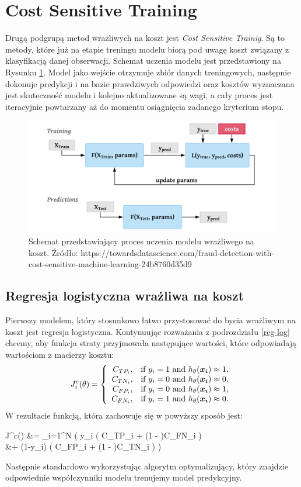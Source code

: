\documentclass{book}
\begin{document}
\section{Cost Sensitive Training}
	Drugą podgrupą metod wrażliwych na koszt jest \textit{Cost Sensitive Trainig}. Są to metody, które już na etapie treningu modelu biorą pod uwagę koszt związany z klasyfikacją danej obserwacji. Schemat uczenia modelu jest przedstawiony na Rysunku \ref{cst}. Model jako wejście otrzymuje zbiór danych treningowych, następnie dokonuje predykcji i na bazie prawdziwych odpowiedzi oraz kosztów wyznaczana jest skuteczność modelu i kolejno aktualizowane są wagi, a cały proces jest iteracyjnie powtarzany aż do momentu osiągnięcia zadanego kryterium stopu.
	\begin{figure}
		\includegraphics[width=\linewidth]{images/cost_sensitive_training.png}
		\caption{Schemat przedstawiający proces uczenia modelu wrażliwego na koszt. Źródło: https://towardsdatascience.com/fraud-detection-with-cost-sensitive-machine-learning-24b8760d35d9}
		\label{cst}
	\end{figure}	

\subsection{Regresja logistyczna wrażliwa na koszt}
		Pierwszy modelem, który stosunkowo łatwo przystosować do bycia wrażliwym na koszt jest regresja logistyczna. Kontynuując rozważania z podrozdziału \ref{reg-log} chcemy, aby funkcja straty przyjmowała następujące wartości, które odpowiadają wartościom z macierzy kosztu:
		$$
		J^c_i(\theta)=\left\{
		\begin{array}{rl}
		C_{TP_i}, &\mbox{if $y_i = 1$ and $h_{\theta}(\boldsymbol{x_i}) \approx 1$}, \\
		C_{TN_i}, &\mbox{if $y_i = 0$ and $h_{\theta}(\boldsymbol{x_i}) \approx 0$}, \\
		C_{FP_i}, &\mbox{if $y_i = 0$ and $h_{\theta}(\boldsymbol{x_i}) \approx 1$}, \\
		C_{FN_i}, &\mbox{if $y_i = 1$ and $h_{\theta}(\boldsymbol{x_i}) \approx 0$}.
		\end{array}
		\right.
		$$
		W rezultacie funkcją, która zachowuje się w powyższy sposób jest:
		\begin{talign*}
			J^c(\theta) &=  \sum_{i=1}^{N} \bigg( y_i \Big( \htx C_{TP_i} + (1 - \htx)C_{FN_i} \Big) \\
			&+ (1-y_i) \Big( \htx C_{FP_i} + (1 - \htx)C_{TN_i} \Big) \bigg)
		\end{talign*}
		Następnie standardowo wykorzystując algorytm optymalizujący, który znajdzie odpowiednie współczynniki modelu trenujemy model predykcyjny.
\end{document}
